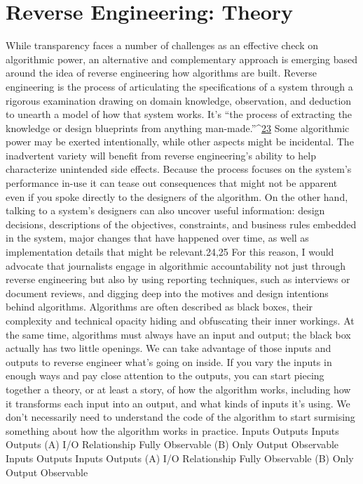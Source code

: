 \chapter{Reverse Engineering: Theory }
While transparency faces a number of challenges as an effective check on algorithmic power, an alternative and complementary approach is emerging based around the idea of reverse engineering how algorithms are built. Reverse engineering is the process of articulating the specifications of a system through a rigorous examination drawing on domain knowledge, observation, and deduction to unearth a model of how that system works. It's ``the process of extracting the knowledge or design blueprints from anything man-made.''^{\href{#endnotes}{23}}
Some algorithmic power may be exerted intentionally, while other aspects might be incidental. The inadvertent variety will benefit from reverse engineering's ability to help characterize unintended side effects. Because the process focuses on the system's performance in-use it can tease out consequences that might not be apparent even if you spoke directly to the designers of the algorithm. On the other hand, talking to a system's designers can also uncover useful information: design decisions, descriptions of the objectives, constraints, and business rules embedded in the system, major changes that have happened over time, as well as implementation details that might be relevant.24,25 For this reason, I would advocate that journalists engage in algorithmic accountability not just through reverse 
engineering but also by using reporting techniques, such as interviews or document reviews, and digging deep into the motives and design intentions behind algorithms. 
Algorithms are often described as black boxes, their complexity and technical opacity hiding and obfuscating their inner workings. At the same time, algorithms must always have an input and output; the black box actually has two little openings. We can take advantage of those inputs and outputs to reverse engineer what's going on inside. If you vary the inputs in enough ways and pay close attention to the outputs, you can start piecing together a theory, or at least a story, of how the algorithm works, including how it transforms each input into an output, and what kinds of inputs it's using. We don't necessarily need to understand the code of the algorithm to start surmising something about how the algorithm works in practice. 
Inputs Outputs Inputs Outputs (A) I/O Relationship Fully Observable (B) Only Output Observable Inputs Outputs Inputs Outputs (A) I/O Relationship Fully Observable (B) Only Output Observable 
